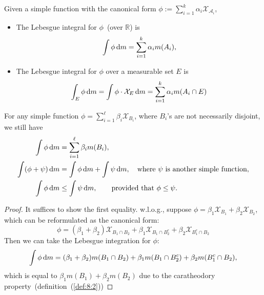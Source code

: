 \begin{definition}
Given a simple function with the canonical form $\phi:=\sum_{i=1}^k\alpha_i\mathcal{X}_{\mathcal{A}_i}$,
\begin{itemize}
\item
The Lebesgue integral for $\phi$~(over $\mathbb{R}$) is
\[
\int\phi\,\mathrm{d} m = \sum_{i=1}^k\alpha_i m(A_i),
\]
\item
The Lebesgue integral for $\phi$ over a measurable set $E$ is
\[
\int_E\phi\,\mathrm{d} m = \int\phi\cdot\mathcal{X}_E\,\mathrm{d} m = 
\sum_{i=1}^k\alpha_im(A_i\cap E)
\]
\end{itemize}
\end{definition}
\begin{proposition}
For any simple function $\phi = \sum_{i=1}^\ell\beta_i\mathcal{X}_{B_i}$,
where $B_i$'s are not necessarily disjoint,
we still have
\begin{align*}
\int\phi\,\mathrm{d} m &= \sum_{i=1}^\ell \beta_im(B_i),\\
\int(\phi+\psi)\,\mathrm{d} m&=\int\phi\,\mathrm{d} m+\int\psi\,\mathrm{d} m,\quad\text{where $\psi$ is another simple function},\\
\int\phi\,\mathrm{d} m&\le \int\psi\,\mathrm{d} m,\qquad\text{provided that $\phi\le\psi$}.
\end{align*}
\end{proposition}
\begin{proof}
It suffices to show the first equality. w.l.o.g., suppose $\phi=\beta_1\mathcal{X}_{B_1}+\beta_2\mathcal{X}_{B_2}$, which can be reformulated as the canonical form:
\[
\phi=(\beta_1+\beta_2)\mathcal{X}_{B_1\cap B_2}+\beta_1\mathcal{X}_{B_1\cap B_2^c}+\beta_2\mathcal{X}_{B_1^c\cap B_2}
\]
Then we can take the Lebesgue integration for $\phi$:
\[
\int\phi\,\mathrm{d} m=(\beta_1+\beta_2)m(B_1\cap B_2)
+\beta_1 m(B_1\cap B_2^c)+\beta_2 m(B_1^c\cap B_2),
\]
which is equal to $\beta_1 m(B_1)+\beta_2 m(B_2)$ due to the caratheodory property~(definition~(\ref{def:8:2}))
\end{proof}


